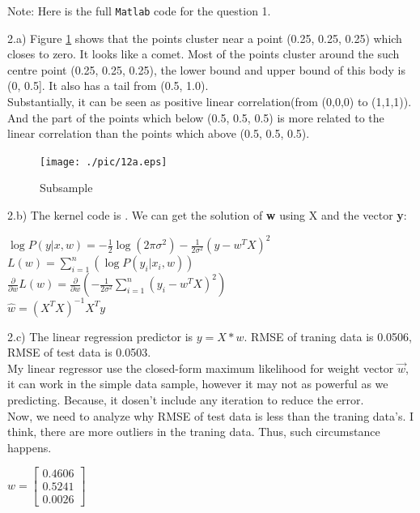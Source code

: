 \documentclass{article}
\begin{document}
Note: Here is the full \verb|Matlab| code for the question 1.


2.a) Figure \ref{fig:12a} shows that the points cluster near a point (0.25, 0.25, 0.25) which closes to zero. It looks like 
a comet. Most of the points cluster around the such centre point (0.25, 0.25, 0.25), the lower bound and upper bound of this 
body is (0, 0.5]. It also has a tail from (0.5, 1.0). \\
Substantially, it can be seen as positive linear correlation(from (0,0,0) to (1,1,1)). And the part of the points which below (0.5, 0.5, 0.5) is 
more related to the linear correlation than the points which above (0.5, 0.5, 0.5).

\begin{figure}[H]
    \centering
    \texttt{[image: ./pic/12a.eps]}
    \caption{Subsample}
    \label{fig:12a}
\end{figure}


2.b) The kernel code is . We can get the solution of \textbf{w} using X and the vector \textbf{y}:

\begin{center}
    $\log P(y | x, w) = -\frac{1}{2}\log (2\pi \sigma^{2}) - \frac{1}{2\sigma^{2}}(y - w^{T}X)^{2}$\\
    $L (w) = \sum\limits_{i=1}^n (\log P(y_{i}|x_{i}, w))$\\
    $\frac{\partial}{\partial w} L(w) = \frac{\partial}{\partial w} (-\frac{1}{2\sigma^{2}} \sum\limits_{i=1}^n (y_{i}-w^{T}X)^{2})$\\
    $\hat{w} = (X^{T}X)^{-1}X^{T}y$
 \end{center}



2.c) The linear regression predictor is $y =  X * w$. RMSE of traning data is 0.0506, RMSE of test data is 0.0503. \\
My linear regressor use the closed-form maximum likelihood for weight vector $\vec{w}$, it can work in the simple data sample,
however it may not as powerful as we predicting. Because, it dosen't include any iteration to reduce the error. \\
Now, we need to analyze why RMSE of test data is less than the traning data's. I think, there are more outliers in the traning data.
Thus, such circumstance happens.

\begin{center}
$w = 
 \begin{bmatrix}
     0.4606 \\
     0.5241 \\
     0.0026 
 \end{bmatrix}$
 \end{center}
\end{document}
